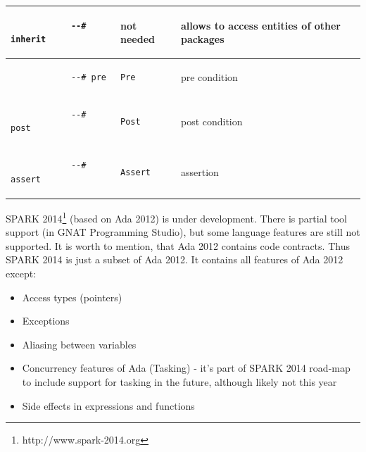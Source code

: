 \begin{center}
\begin{longtable}{| p{1.5in} | p{1.5in} | p{3in} |}
		\\ \hline

		\begin{lstlisting}
			--# inherit
		\end{lstlisting} 
		& 
		not needed
		& 
		allows to access entities of other packages

		\\ \hline

		\begin{lstlisting}
			--# pre
		\end{lstlisting} 
		& 
		\begin{lstlisting}[language=ada2012]
			Pre
		\end{lstlisting} 
		& 
		pre condition

		\\ \hline
		

		\begin{lstlisting}
			--# post
		\end{lstlisting} 
		& 
		\begin{lstlisting}[language=ada2012]
			Post
		\end{lstlisting} 
		& 
		post condition

		\\ \hline
		

		\begin{lstlisting}
			--# assert
		\end{lstlisting} 
		& 
		\begin{lstlisting}[language=ada2012]
			Assert
		\end{lstlisting} 
		& 
		assertion

		\\ \hline
	\end{longtable}
\end{center}
\doublespacing

SPARK 2014\footnote{http://www.spark-2014.org} (based on Ada 2012) is under development. There is partial tool support (in GNAT Programming Studio), but some language features are still not supported. It is worth to mention, that Ada 2012 contains code contracts. Thus SPARK 2014 is just a subset of Ada 2012. \cite{Spark2014:Paper} It contains all features of Ada 2012 except:
\begin{itemize} \itemsep1pt \parskip0pt 
 	\item Access types (pointers)
 	\item Exceptions
	\item Aliasing between variables
	\item Concurrency features of Ada (Tasking) - it's part of SPARK 2014 road-map to include support for tasking in the future, although likely not this year
	\item Side effects in expressions and functions
\end{itemize}

